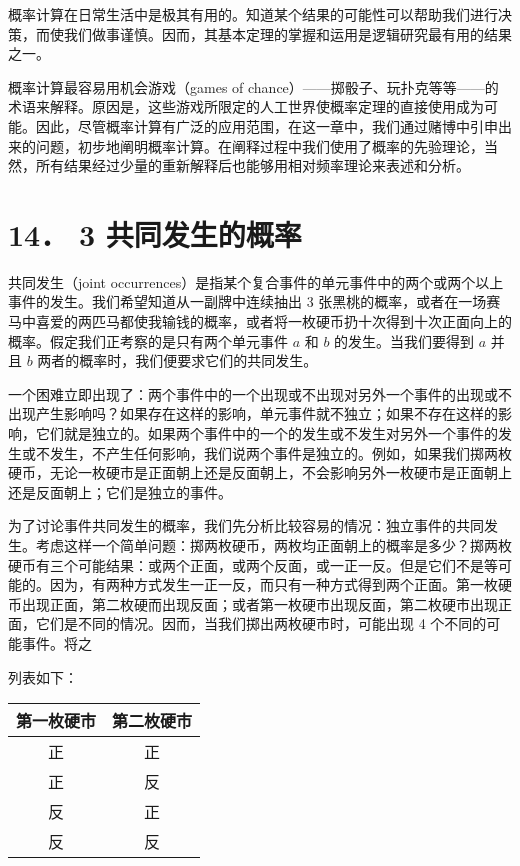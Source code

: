 概率计算在日常生活中是极其有用的。知道某个结果的可能性可以帮助我们进行决策，而使我们做事谨慎。因而，其基本定理的掌握和运用是逻辑研究最有用的结果之一。

概率计算最容易用机会游戏（games of chance）——掷骰子、玩扑克等等——的术语来解释。原因是，这些游戏所限定的人工世界使概率定理的直接使用成为可能。因此，尽管概率计算有广泛的应用范围，在这一章中，我们通过赌博中引申出来的问题，初步地阐明概率计算。在阐释过程中我们使用了概率的先验理论，当然，所有结果经过少量的重新解释后也能够用相对频率理论来表述和分析。

\section*{14． 3 共同发生的概率}
共同发生（joint occurrences）是指某个复合事件的单元事件中的两个或两个以上事件的发生。我们希望知道从一副牌中连续抽出 3 张黑桃的概率，或者在一场赛马中喜爱的两匹马都使我输钱的概率，或者将一枚硬币扔十次得到十次正面向上的概率。假定我们正考察的是只有两个单元事件 $a$ 和 $b$ 的发生。当我们要得到 $a$ 并且 $b$ 两者的概率时，我们便要求它们的共同发生。

一个困难立即出现了：两个事件中的一个出现或不出现对另外一个事件的出现或不出现产生影响吗？如果存在这样的影响，单元事件就不独立；如果不存在这样的影响，它们就是独立的。如果两个事件中的一个的发生或不发生对另外一个事件的发生或不发生，不产生任何影响，我们说两个事件是独立的。例如，如果我们掷两枚硬币，无论一枚硬市是正面朝上还是反面朝上，不会影响另外一枚硬市是正面朝上还是反面朝上；它们是独立的事件。

为了讨论事件共同发生的概率，我们先分析比较容易的情况：独立事件的共同发生。考虑这样一个简单问题：掷两枚硬币，两枚均正面朝上的概率是多少？掷两枚硬币有三个可能结果：或两个正面，或两个反面，或一正一反。但是它们不是等可能的。因为，有两种方式发生一正一反，而只有一种方式得到两个正面。第一枚硬币出现正面，第二枚硬而出现反面；或者第一枚硬市出现反面，第二枚硬市出现正面，它们是不同的情况。因而，当我们掷出两枚硬市时，可能出现 4 个不同的可能事件。将之

列表如下：

\begin{center}
\begin{tabular}{|cc|}
\hline
第一枚硬市 & 第二枚硬市 \\
\hline
正 & 正 \\
正 & 反 \\
反 & 正 \\
反 & 反 \\
\hline
\end{tabular}
\end{center}

